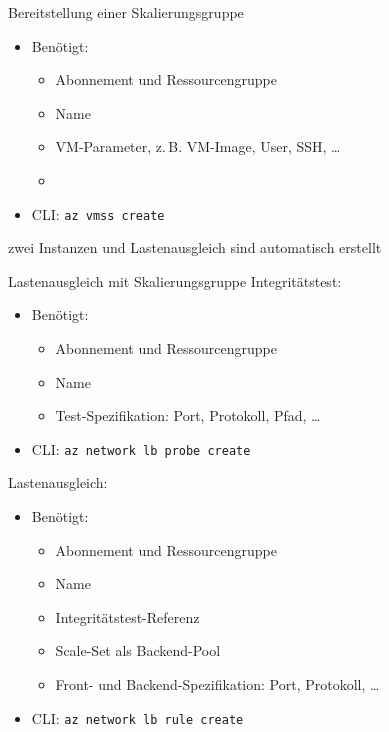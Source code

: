 \begin{flashcard}[Definition]{Bereitstellung einer Skalierungsgruppe}
    \begin{itemize}
        \item Benötigt:
            \begin{itemize}
                \item Abonnement und Ressourcengruppe
                \item Name
                \item VM-Parameter, z.\,B. VM-Image, User, SSH, \ldots
                \item
            \end{itemize}
        \item CLI: \texttt{az vmss create}
    \end{itemize}
    zwei Instanzen und Lastenausgleich sind automatisch erstellt
\end{flashcard}

\begin{flashcard}[Definition]{Lastenausgleich mit Skalierungsgruppe}
    Integritätstest:
    \begin{itemize}
        \item Benötigt:
        \begin{itemize}
            \item Abonnement und Ressourcengruppe
            \item Name
            \item Test-Spezifikation: Port, Protokoll, Pfad, \ldots
        \end{itemize}
        \item CLI: \texttt{az network lb probe create}
    \end{itemize}
    Lastenausgleich:
    \begin{itemize}
        \item Benötigt:
        \begin{itemize}
            \item Abonnement und Ressourcengruppe
            \item Name
            \item Integritätstest-Referenz
            \item Scale-Set als Backend-Pool
            \item Front- und Backend-Spezifikation: Port, Protokoll, \ldots
        \end{itemize}
        \item CLI: \texttt{az network lb rule create}
    \end{itemize}
\end{flashcard}

